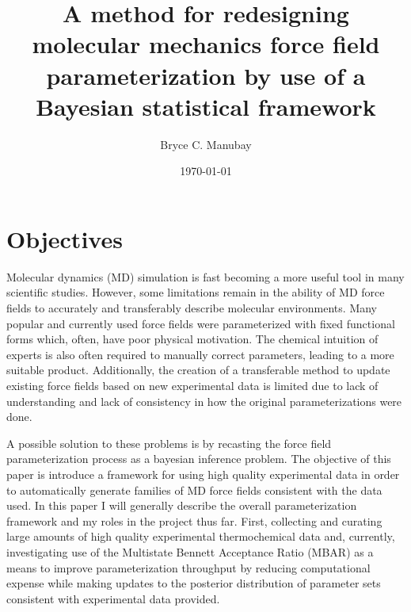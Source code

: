 \documentclass[rmp,nofootinbib,superscriptaddress,12pt,tightenlines,notitlepage]{revtex4-1}
\begin{document}

\title{A method for redesigning molecular mechanics force field parameterization by use of a Bayesian statistical framework\vspace{-2ex}}
\author{Bryce C. Manubay\vspace{-2ex}} 
\date{\today\vspace{-2ex}}

\section{Objectives}
Molecular dynamics (MD) simulation is fast becoming a more useful tool in many scientific studies. 
However, some limitations remain in the ability of MD force fields to accurately and transferably 
describe molecular environments. Many popular and currently used force fields were parameterized 
with fixed functional forms which, often, have poor physical motivation. The chemical intuition of 
experts is also often required to manually correct parameters, leading to a more suitable product. 
Additionally, the creation of a transferable method to update existing force fields based on new 
experimental data is limited due to lack of understanding and lack of consistency in how the original 
parameterizations were done.

A possible solution to these problems is by recasting the force field parameterization process as a 
bayesian inference problem. The objective of this paper is introduce a framework for using high quality 
experimental data in order to automatically generate families of MD force fields consistent with the data 
used. In this paper I will generally describe the overall parameterization framework and my roles in the project 
thus far. First, collecting and curating large amounts of high quality experimental thermochemical data 
and, currently, investigating use of the Multistate Bennett Acceptance Ratio (MBAR) as a means to improve 
parameterization throughput by reducing computational expense while making updates to the posterior distribution 
of parameter sets consistent with experimental data provided.
\end{document}
